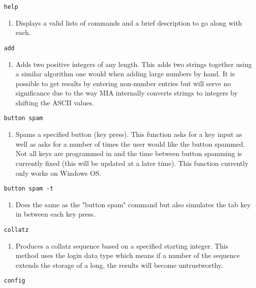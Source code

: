 \begin{lstlisting}
help
\end{lstlisting}
\begin{enumerate}
	\item[] Displays a valid lists of commands and a brief description to go along with each.
\end{enumerate}
\begin{lstlisting} 
add   
\end{lstlisting}
\begin{enumerate}
	\item[] Adds two positive integers of any length. This adds two strings together using a similar algorithm one would when adding large numbers by hand. It is possible to get results by entering non-number entries but will serve no significance due to the way MIA internally converts strings to integers by shifting the ASCII values.
\end{enumerate}
\begin{lstlisting} 
button spam
\end{lstlisting}
\begin{enumerate}
	\item[] Spams a specified button (key press). This function asks for a key input as well as asks for a number of times the user would like the button spammed. Not all keys are programmed in and the time between button spamming is currently fixed (this will be updated at a later time). This function currently only works on Windows OS.
\end{enumerate}
\begin{lstlisting} 
button spam -t
\end{lstlisting}
\begin{enumerate}
	\item[] Does the same as the "button spam" command but also simulates the tab key in between each key press.
\end{enumerate}
\begin{lstlisting} 
collatz   
\end{lstlisting}
\begin{enumerate}
	\item[] Produces a collatz sequence based on a specified starting integer. This method uses the login data type which means if a number of the sequence extends the storage of a long, the results will become untrustworthy. 
\end{enumerate}
\begin{lstlisting} 
config 
\end{lstlisting}
